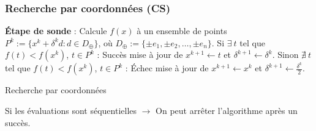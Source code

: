 \documentclass{beamer}
\newcommand\tab[1][1cm]{\hspace*{#1}}
\newcommand{\CS}{\textsf{CS}}
\begin{document}
\begin{frame}
\frametitle{Recherche par coordonnées (\CS)}
\begin{algorithm}[H]
\begin{algorithmic}[]
\STATE \textbf{Étape de sonde} : Calcule $f(x)$ à un ensemble de points $P^k:=\{x^k+\delta ^k d:d\in D_{\oplus}\}$, où $D_{\oplus} := \{\pm e_1,\pm e_2,\dots,\pm e_n\}$.
\STATE
\STATE Si $\exists~t$ tel que $f(t) < f(x^k)$, $t\in P^k$ : Succès
\STATE \tab mise à jour de $x^{k+1}\leftarrow t$ et $\delta^{k+1} \leftarrow \delta^k$.
\STATE
\STATE Sinon $\nexists~t$ tel que $f(t) < f(x^k)$, $t\in P^k$ : Échec
\STATE \tab mise à jour de $x^{k+1}\leftarrow x^k$ et $\delta^{k+1} \leftarrow \frac{\delta^k}{2}$.
\ENDFOR
\end{algorithmic}
\caption{Recherche par coordonnées}
\label{alg:cs}
\end{algorithm}
Si les évaluations sont séquentielles $\rightarrow$ On peut arrêter l'algorithme après un succès.
\end{frame}
\end{document}
